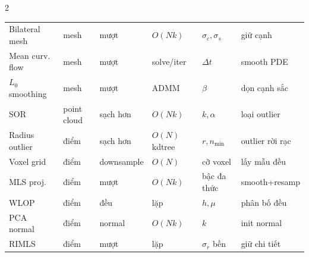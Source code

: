 \begin{paracol}{2}
\begin{tabular}{@{}p{2.4cm}p{1.4cm}p{1.5cm}p{1.5cm}p{1.9cm}p{2.2cm}@{}}
Bilateral mesh & mesh & mượt & $O(Nk)$ & $\sigma_c,\sigma_s$ & giữ cạnh \\
Mean curv. flow & mesh & mượt & solve/iter & $\Delta t$ & smooth PDE \\
$L_0$ smoothing & mesh & mượt & ADMM & $\beta$ & dọn cạnh sắc \\
SOR & point cloud & sạch hơn & $O(Nk)$ & $k,\alpha$ & loại outlier \\
Radius outlier & điểm & sạch hơn & $O(N)$ kdtree & $r,n_{\min}$ & outlier rời rạc \\
Voxel grid & điểm & down\-sample & $O(N)$ & cỡ voxel & lấy mẫu đều \\
MLS proj. & điểm & mượt & $O(Nk)$ & bậc đa thức & smooth+resamp \\
WLOP & điểm & đều & lặp & $h,\mu$ & phân bố đều \\
PCA normal & điểm & normal & $O(Nk)$ & $k$ & init normal \\
RIMLS & điểm & mượt & lặp & $\sigma_r$ bền & giữ chi tiết \\
\bottomrule
\end{tabular}
\normalsize

\switchcolumn*


\end{paracol}
